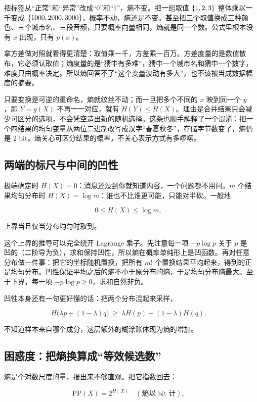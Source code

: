 把标签从``正常''和``异常''改成``\(0\)''和``\(1\)''，熵不变。把一组取值 \(\left\{1,2,3\right\}\) 整体乘以一千变成 \(\left\{1000,2000,3000\right\}\)，概率不动，熵还是不变。甚至把三个取值换成三种颜色、三个城市名、三段音频，只要概率向量相同，熵就是同一个数。公式里根本没有 \(x\) 出现，只有 \(p(x)\)。

拿方差做对照就看得更清楚：取值乘一千，方差乘一百万。方差度量的是数值散布，它必须认取值；熵度量的是``猜中有多难''，猜中一个城市名和猜中一个数字，难度只由概率决定。所以熵回答不了``这个变量波动有多大''，也不该被当成数据幅度的摘要。

只要变换是可逆的重命名，熵就纹丝不动；而一旦把多个不同的 \(x\) 映到同一个 \(y\)，即 \(Y=g(X)\) 不再一一对应，就有 \(H(Y)\le H(X)\)。理由是合并结果只会减少可区分的选项，不会凭空造出新的随机选择。这条也顺手解释了一个混淆：把一个四结果的均匀变量从两位二进制改写成汉字``春夏秋冬''，存储字节数变了，熵仍是 \(2\) bit。熵关心可区分结果的概率，不关心表示方式有多啰嗦。

\subsection{两端的标尺与中间的凹性}

极端确定时 \(H(X)=0\)：消息还没到你就知道内容，一个问题都不用问。\(m\) 个结果均匀分布时 \(H(X)=\log m\)：谁也不比谁更可能，只能对半砍。一般地

\[
0\le H(X)\le\log m,
\]

上界当且仅当分布均匀时取到。

这个上界的推导可以完全绕开 Lagrange 乘子。先注意每一项 \(-p\log p\) 关于 \(p\) 是凹的（二阶导为负），求和保持凹性，所以熵在概率单纯形上是凹函数。再对任意分布做一件事：把它的坐标随机置换，把所有 \(m!\) 个置换结果平均起来，得到的正是均匀分布。凹性保证平均之后的熵不小于原分布的熵，于是均匀分布熵最大。至于下界，每一项 \(-p\log p\ge0\)，求和自然非负。

凹性本身还有一句更好懂的话：把两个分布混起来采样，

\[
H\bigl(\lambda p+(1-\lambda)q\bigr)\ \ge\ \lambda H(p)+(1-\lambda)H(q).
\]

不知道样本来自哪个成分，这层额外的糊涂账体现为熵的增加。

\subsection{困惑度：把熵换算成``等效候选数''}

熵是个对数尺度的量，报出来不够直观。把它指数回去：

\[
\mathrm{PP}(X)=2^{H(X)}\quad(\text{熵以 bit 计}),
\]

